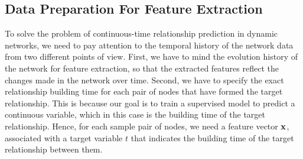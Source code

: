 \subsection{Data Preparation For Feature Extraction}
To solve the problem of continuous-time relationship prediction in dynamic networks, we need to pay attention to the temporal history of the network data from two different points of view. First, we have to mind the evolution history of the network for feature extraction, so that the extracted features reflect the changes made in the network over time. Second, we have to specify the exact relationship building time for each pair of nodes that have formed the target relationship. This is because our goal is to train a supervised model to predict a continuous variable, which in this case is the building time of the target relationship. Hence, for each sample pair of nodes, we need a feature vector $\mathbf{x}$, associated with a target variable $t$ that indicates the building time of the target relationship between them.

